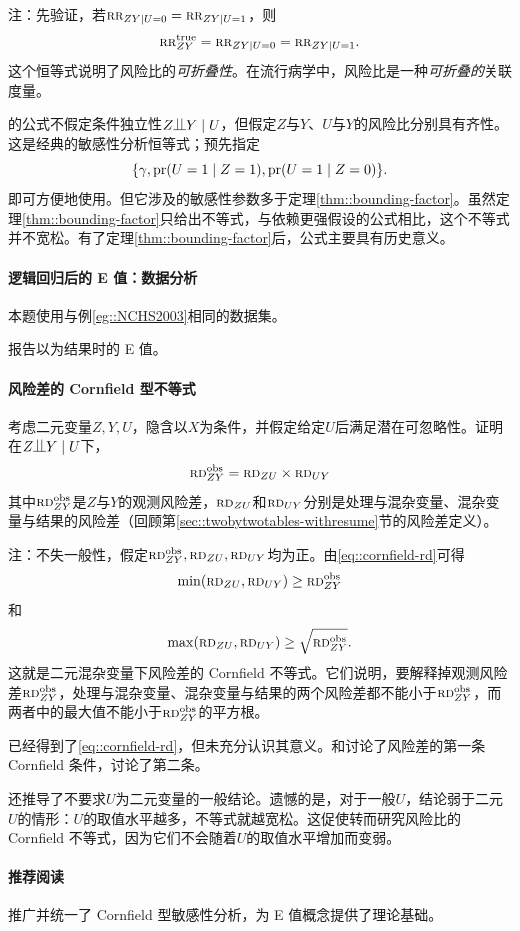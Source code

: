 注：先验证，若$\textsc{rr}_{ZY|U=0} = \textsc{rr}_{ZY|U=1}$，则
$$
\textsc{rr}_{ZY}^{\textup{true}}  = \textsc{rr}_{ZY|U=0} = \textsc{rr}_{ZY|U=1} . 
$$
这个恒等式说明了风险比的{\it 可折叠性}。在流行病学中，风险比是一种{\it 可折叠的}关联度量。


 
\citet{Schlesselman::1978}的公式不假定条件独立性$Z\ind Y\mid U$，但假定$Z$与$Y$、$U$与$Y$的风险比分别具有齐性。这是经典的敏感性分析恒等式；预先指定
$$
\{   \gamma  ,  \textup{pr}(U=1\mid Z=1), \textup{pr}(U=1\mid Z=0)  \} .
$$
即可方便地使用。但它涉及的敏感性参数多于定理\ref{thm::bounding-factor}。虽然定理\ref{thm::bounding-factor}只给出不等式，与依赖更强假设的\citet{Schlesselman::1978}公式相比，这个不等式并不宽松。有了定理\ref{thm::bounding-factor}后，\citet{Schlesselman::1978}公式主要具有历史意义。 



 
\paragraph{逻辑回归后的 E 值：数据分析}\label{hw::eg::NCHS2003}

本题使用与例\ref{eg::NCHS2003}相同的数据集。 

报告以为结果时的 E 值。 


\paragraph{风险差的 Cornfield 型不等式}\label{hw::cornfield-rd}



考虑二元变量$Z, Y, U$，隐含以$X$为条件，并假定给定$U$后满足潜在可忽略性。证明在$Z\ind Y\mid U$下，
\begin{eqnarray}
\textsc{rd}_{ZY}^{\textup{obs}} = \textsc{rd}_{ZU} \times \textsc{rd}_{UY}
\label{eq::cornfield-rd}
\end{eqnarray}
其中$\textsc{rd}_{ZY}^{\textup{obs}}$是$Z$与$Y$的观测风险差，$\textsc{rd}_{ZU}$和$ \textsc{rd}_{UY}$分别是处理与混杂变量、混杂变量与结果的风险差（回顾第\ref{sec::twobytwotables-withresume}节的风险差定义）。 


注：不失一般性，假定$\textsc{rd}_{ZY}^{\textup{obs}}, \textsc{rd}_{ZU} ,\textsc{rd}_{UY}$均为正。由\eqref{eq::cornfield-rd}可得
$$
\min(\textsc{rd}_{ZU}  , \textsc{rd}_{UY}) \geq \textsc{rd}_{ZY}^{\textup{obs}}
$$
和
$$
\max(\textsc{rd}_{ZU}  , \textsc{rd}_{UY}) \geq  \sqrt{ \textsc{rd}_{ZY}^{\textup{obs}}} .
$$
这就是二元混杂变量下风险差的 Cornfield 不等式。它们说明，要解释掉观测风险差$\textsc{rd}_{ZY}^{\textup{obs}}$，处理与混杂变量、混杂变量与结果的两个风险差都不能小于$\textsc{rd}_{ZY}^{\textup{obs}}$，而两者中的最大值不能小于$\textsc{rd}_{ZY}^{\textup{obs}}$的平方根。

\citet{Cornfield::1959}已经得到了\eqref{eq::cornfield-rd}，但未充分认识其意义。\citet{gastwirth1998cornfield}和\citet{poole2010origin}讨论了风险差的第一条 Cornfield 条件，\citet{ding2014generalized}讨论了第二条。 

\citet{ding2014generalized}还推导了不要求$U$为二元变量的一般结论。遗憾的是，对于一般$U$，结论弱于二元$U$的情形：$U$的取值水平越多，不等式就越宽松。这促使\citet{ding2016sensitivity}转而研究风险比的 Cornfield 不等式，因为它们不会随着$U$的取值水平增加而变弱。




\paragraph{推荐阅读}


\citet{ding2016sensitivity}推广并统一了 Cornfield 型敏感性分析，为 E 值概念提供了理论基础。   

